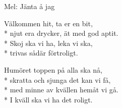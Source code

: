 \begin{SongText}[Välkomstvisa]
    \begin{SongInfo}
        Mel: Jänta å jag
    \end{SongInfo}
    \begin{SongVerse}
        Välkommen hit, ta er en bit,\\*%
        njut era drycker, ät med god aptit.\\*%
        Skoj ska vi ha, leka vi ska,\\*%
        trivas sådär förtroligt.
    \end{SongVerse}
    \begin{SongVerse}
        Humöret toppen på alla ska nå,\\*%
        skratta och sjunga det kan vi få,\\*%
        med minne av kvällen hemåt vi gå.\\*%
        I kväll ska vi ha det roligt.
    \end{SongVerse}
\end{SongText}